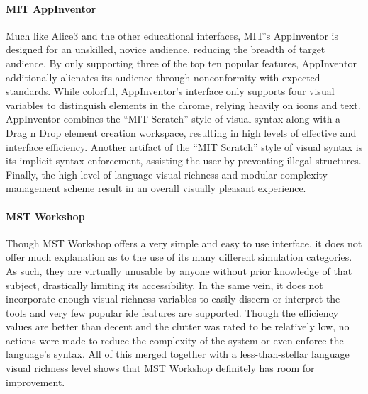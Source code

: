 \paragraph{MIT AppInventor} Much like Alice3 and the other educational
interfaces, MIT's AppInventor is designed for an unskilled, novice
audience, reducing the breadth of target audience. By only supporting three
of the top ten popular features, AppInventor additionally alienates its
audience through nonconformity with expected standards. While colorful,
AppInventor's interface only supports four visual variables to distinguish
elements in the chrome, relying heavily on icons and text. AppInventor
combines the ``MIT Scratch'' style of visual syntax along with a Drag n
Drop element creation workspace, resulting in high levels of effective and
interface efficiency. Another artifact of the ``MIT Scratch'' style of
visual syntax is its implicit syntax enforcement, assisting the user by
preventing illegal structures. Finally, the high level of language visual
richness and modular complexity management scheme result in an overall
visually pleasant experience.

\paragraph{MST Workshop} Though MST Workshop offers a very simple and
easy to use interface, it does not offer much explanation as to the use of
its many different simulation categories. As such, they are virtually
unusable by anyone without prior knowledge of that subject, drastically
limiting its accessibility. In the same vein, it does not incorporate
enough visual richness variables to easily discern or interpret the tools
and very few popular \ac{ide} features are supported. Though the efficiency
values are better than decent and the clutter was rated to be relatively
low, no actions were made to reduce the complexity of the system or even
enforce the language's syntax. All of this merged together with a
less-than-stellar language visual richness level shows that MST Workshop
definitely has room for improvement.

